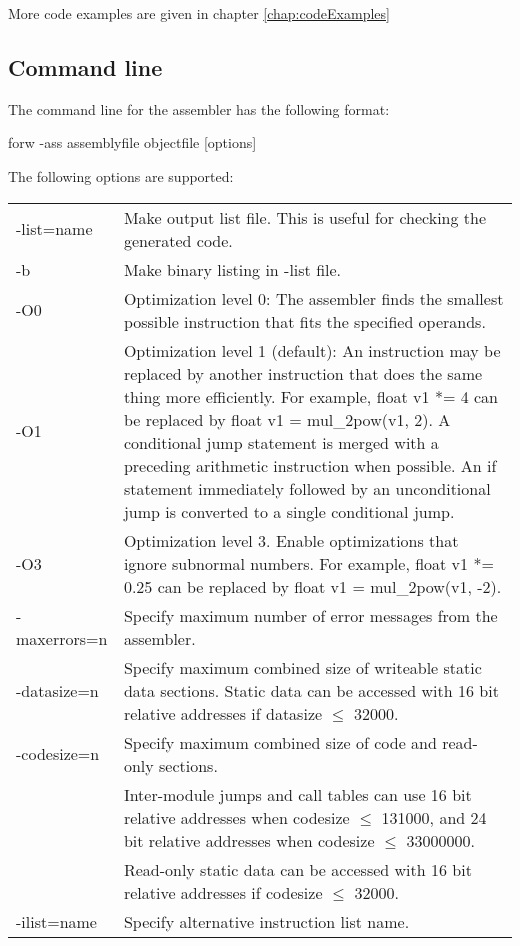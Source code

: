 \documentclass[forwardcom.tex]{subfiles}
\begin{document}
More code examples are given in chapter \ref{chap:codeExamples}
\vspace{2mm}

\subsection{Command line} \label{assemblerCommandLine}
The command line for the assembler has the following format:

\vspace{2mm}
\hspace{5mm} {\ttfamily forw -ass assemblyfile objectfile [options]}

\vspace{2mm}
The following options are supported:\\
\begin{tabular}{|p{25mm}p{135mm}|}
\hline
-list=name & Make output list file. This is useful for checking the generated code.\\
-b         & Make binary listing in -list file. \\
-O0 & Optimization level 0: The assembler finds the smallest possible instruction that fits the specified operands. \\
-O1 & Optimization level 1 (default): An instruction may be replaced by another instruction that does the same thing more efficiently. For example, {\ttfamily float v1 *= 4} can be replaced by
 {\ttfamily float v1 = mul\_2pow(v1, 2)}. 
 A conditional jump statement is merged with a preceding arithmetic instruction when possible.
 An {\ttfamily if} statement immediately followed by an
 unconditional jump is converted to a single conditional jump.\\
-O3 & Optimization level 3. Enable optimizations that ignore subnormal numbers. For example, {\ttfamily float v1 *= 0.25} can be replaced by {\ttfamily float v1 = mul\_2pow(v1, -2)}.\\
-maxerrors=n & Specify maximum number of error messages from the assembler.\\
-datasize=n & Specify maximum combined size of writeable static data sections. Static data can be accessed with 16 bit relative addresses if datasize $\leq$ 32000. \\
-codesize=n & Specify maximum combined size of code and read-only sections. \\
           & Inter-module jumps and call tables can use 16 bit relative addresses when codesize $\leq$ 131000, and 24 bit relative addresses when codesize $\leq$ 33000000. \\
           & Read-only static data can be accessed with 16 bit relative addresses if codesize $\leq$ 32000. \\
-ilist=name & Specify alternative instruction list name.\\
\hline
\end{tabular}
\vspace{2mm}
\end{document}
